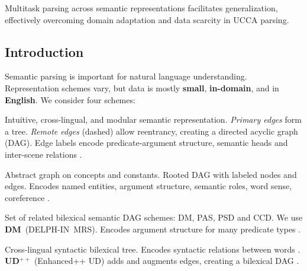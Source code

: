 \documentclass[a0,portrait]{a0poster}
\begin{document}
\vspace{1cm}
\titlespacing*{\section}{0pt}{8mm}{5mm}


\begin{adjustbox}{margin=3mm,frame,minipage=.6\linewidth,center}
\Large\color{Navy}
Multitask parsing across semantic representations facilitates generalization,
effectively overcoming domain adaptation and data scarcity in UCCA parsing.
\end{adjustbox}


\begin{multicols}{2}


\color{Black}

\section*{Introduction}

Semantic parsing is important for natural language understanding.
Representation schemes vary,
but data is mostly \textbf{small}, \textbf{in-domain}, and in \textbf{English}.
\hfill We consider four schemes:
\begin{itemize}[nosep,labelsep=1em]
{\color{Indigo} \item[\textbf{UCCA}:] Intuitive, cross-lingual, and modular semantic representation.
    \textit{Primary edges} form a tree. \textit{Remote edges} (dashed) allow reentrancy,
    creating a directed acyclic graph (DAG).
    Edge labels encode predicate-argument structure, semantic heads and inter-scene relations
    \cite{abend2013universal}.}
{\color{DarkGreen} \item[\textbf{AMR}:] Abstract graph on concepts and constants.
    Rooted DAG with labeled nodes and edges.
    Encodes named entities, argument structure, semantic roles, word sense, coreference \cite{banarescu2013abstract}.}
{\color{DarkRed} \item[\textbf{SDP}:] Set of related bilexical semantic DAG schemes: DM, PAS, PSD and CCD.
    We use \textbf{DM}~(DELPH-IN~MRS).
    Encodes argument structure for many predicate types \cite{oepen2016towards}.}
{\color{DarkBlue} \item[\textbf{UD}:] Cross-lingual syntactic bilexical tree.
    Encodes syntactic relations between words \cite{nivre2016universal}. \\
    \textbf{UD$^{++}$} (Enhanced++ UD) adds and augments edges, creating a bilexical DAG
    \cite{SCHUSTER16.779}.}
\end{itemize}


\end{multicols}
\end{document}
